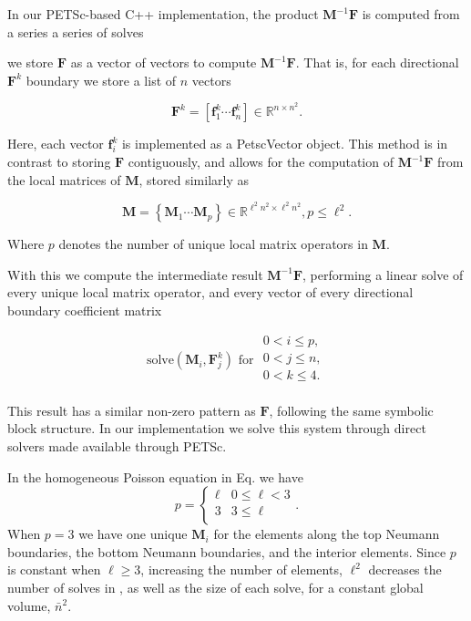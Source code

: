 \noindent
In our PETSc-based C++ implementation, the product 
$\textbf{M}^{-1}\textbf{F}$ is computed from a series a series of solves 

we store $\textbf{F}$ as a vector 
of vectors to compute $\textbf{M}^{-1}\textbf{F}$. That is, for each 
directional $\textbf{F}^k$ boundary we store a list of $n$ vectors

\begin{equation}
	\textbf{F}^k = \left[\textbf{f}^k_1 \cdots \textbf{f}^k_n\right] 
	\in \mathbb{R}^{n \times n^2}.
\end{equation} 

\noindent
Here, each vector $\textbf{f}^k_i$ is implemented as a PetscVector object.
This method is in contrast to storing $\textbf{F}$ contiguously, and 
allows for the computation of $\textbf{M}^{-1}\textbf{F}$ from the local 
matrices of $\textbf{M}$, stored similarly as

\begin{equation}
	\textbf{M} = \left\{\textbf{M}_1 \cdots \textbf{M}_p\right\} \in 
	\mathbb{R}^{\ell^2 n^2 \times \ell^2 n^2}, p \leq \ell^2.
\end{equation} 

\noindent 
Where $p$ denotes the number of unique local matrix operators in 
$\textbf{M}$. 

With this we compute the intermediate result $\textbf{M}^{-1}\textbf{F}$, 
performing a linear solve of every unique local matrix operator, and 
every vector of every directional boundary coefficient matrix 

\begin{equation}
	\text{solve}(\textbf{M}_{i}, \textbf{F}^{k}_j) \text{  for }
	\begin{array}{l}
		0 < i \leq p, \\
		0 < j \leq n, \\
		0 < k \leq 4. \\ 
	\end{array}
	\label{eqn:mfsolves}
\end{equation}

\noindent
This result has a similar non-zero pattern as $\textbf{F}$, following the same symbolic block structure. In our implementation we solve this system through direct solvers made available through PETSc. 

\begin{aside}
	In the homogeneous Poisson equation in Eq.  we have 
	\begin{equation}
		p = \begin{cases}
		    \ell &  0 \leq \ell < 3 \\ 
			3 &  3 \leq \ell \\ 
		\end{cases}.
	\end{equation} 
	\noindent 
	When $p = 3$ we have one unique $\textbf{M}_i$ for the elements along the top Neumann boundaries, the bottom Neumann boundaries, and the interior elements. 
	Since $p$ is constant when $\ell \geq 3$, increasing the number of elements, $\ell^2$ decreases the number of solves in , as well as the size of each solve, for a constant global volume, $\bar{n}^2$. 
\end{aside}

